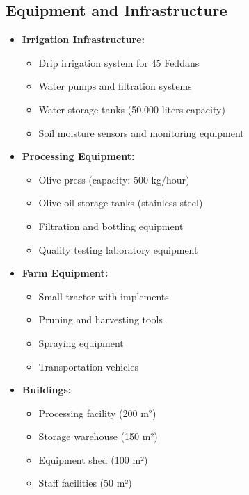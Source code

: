 \subsection{Equipment and Infrastructure}
\begin{itemize}
    \item \textbf{Irrigation Infrastructure:}
    \begin{itemize}
        \item Drip irrigation system for 45 Feddans
        \item Water pumps and filtration systems
        \item Water storage tanks (50,000 liters capacity)
        \item Soil moisture sensors and monitoring equipment
    \end{itemize}
    \item \textbf{Processing Equipment:}
    \begin{itemize}
        \item Olive press (capacity: 500 kg/hour)
        \item Olive oil storage tanks (stainless steel)
        \item Filtration and bottling equipment
        \item Quality testing laboratory equipment
    \end{itemize}
    \item \textbf{Farm Equipment:}
    \begin{itemize}
        \item Small tractor with implements
        \item Pruning and harvesting tools
        \item Spraying equipment
        \item Transportation vehicles
    \end{itemize}
    \item \textbf{Buildings:}
    \begin{itemize}
        \item Processing facility (200 m²)
        \item Storage warehouse (150 m²)
        \item Equipment shed (100 m²)
        \item Staff facilities (50 m²)
    \end{itemize}
\end{itemize}

